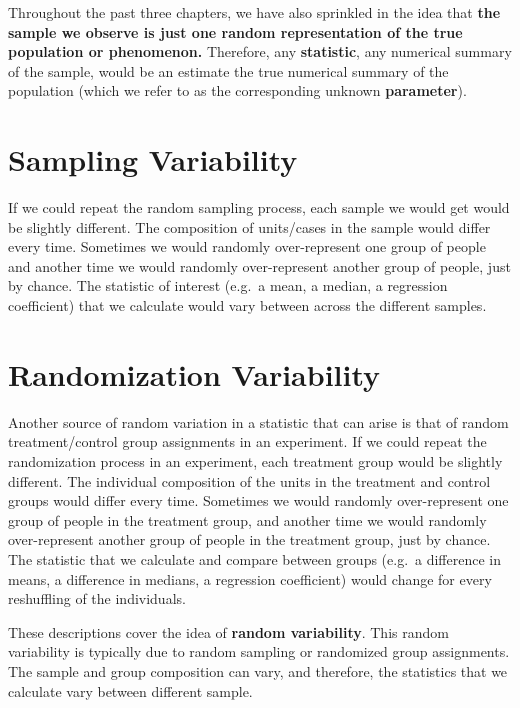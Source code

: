 \documentclass[
]{book}
\begin{document}
Throughout the past three chapters, we have also sprinkled in the idea that \textbf{the sample we observe is just one random representation of the true population or phenomenon.} Therefore, any \textbf{statistic}, any numerical summary of the sample, would be an estimate the true numerical summary of the population (which we refer to as the corresponding unknown \textbf{parameter}).

\hypertarget{sampling-variability}{%
\section{Sampling Variability}\label{sampling-variability}}

If we could repeat the random sampling process, each sample we would get would be slightly different. The composition of units/cases in the sample would differ every time. Sometimes we would randomly over-represent one group of people and another time we would randomly over-represent another group of people, just by chance. The statistic of interest (e.g.~a mean, a median, a regression coefficient) that we calculate would vary between across the different samples.

\hypertarget{randomization-variability}{%
\section{Randomization Variability}\label{randomization-variability}}

Another source of random variation in a statistic that can arise is that of random treatment/control group assignments in an experiment. If we could repeat the randomization process in an experiment, each treatment group would be slightly different. The individual composition of the units in the treatment and control groups would differ every time. Sometimes we would randomly over-represent one group of people in the treatment group, and another time we would randomly over-represent another group of people in the treatment group, just by chance. The statistic that we calculate and compare between groups (e.g.~a difference in means, a difference in medians, a regression coefficient) would change for every reshuffling of the individuals.

These descriptions cover the idea of \textbf{random variability}. This random variability is typically due to random sampling or randomized group assignments. The sample and group composition can vary, and therefore, the statistics that we calculate vary between different sample.
\end{document}
